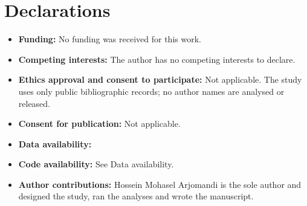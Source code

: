 \documentclass[pdflatex,sn-basic]{sn-jnl}
\begin{document}



\backmatter

\section*{Declarations}\label{sec:availability}

\begin{itemize}
\item \textbf{Funding:} No funding was received for this work.
\item \textbf{Competing interests:} The author has no competing interests to declare.
\item \textbf{Ethics approval and consent to participate:} Not applicable. The study uses only public bibliographic
records; no author names are analysed or released.
\item \textbf{Consent for publication:} Not applicable.
\item \textbf{Data availability:} 
\item \textbf{Code availability:} See Data availability.
\item \textbf{Author contributions:} Hossein Mohasel Arjomandi is the sole author and designed the study, ran the analyses and wrote the manuscript.
\end{itemize}


\end{document}
